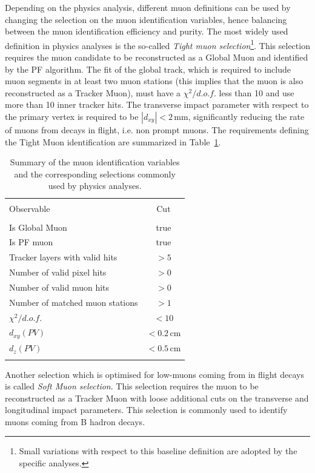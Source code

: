 Depending on the physics analysis, different muon definitions can be used by changing the selection on the muon identification variables, hence balancing between the muon identification efficiency and purity. The most widely used definition in physics analyses is the so-called \emph{Tight muon selection}\footnote{Small variations with respect to this baseline definition are adopted by the specific analyses.}. This selection requires the muon candidate to be reconstructed as a Global Muon and identified by the PF algorithm. The fit of the global track, which is required to include muon segments in at least two muon stations (this implies that the muon is also reconstructed as a Tracker Muon), must have a $\chi^2/d.o.f.$ less than 10 and use more than 10 inner tracker hits. The transverse impact parameter with respect to the primary vertex is required to be $|d_{xy}|<2$\,mm, significantly reducing the rate of muons from decays in flight, i.e. non prompt muons. The requirements defining the Tight Muon identification are summarized in Table~\ref{tab:tightmuon}.

\begin{table}[htb]
\caption{Summary of the muon identification variables and the corresponding selections commonly used by physics analyses.}\label{tab:tightmuon}
\centering
\begin{tabular}{lc}
\toprule \\
Observable & Cut \\
\midrule \\
Is Global Muon & true \\
Is PF muon & true \\
Tracker layers with valid hits & $>5$ \\
Number of valid pixel hits & $>0$ \\
Number of valid muon hits & $>0$ \\
Number of matched muon stations & $>1$ \\
$\chi^2/d.o.f.$ & $<10$ \\
$d_{xy}(PV)$ & $< 0.2$\,cm \\
$d_{z}(PV)$ & $< 0.5$\,cm \\
\bottomrule \\
\end{tabular}
\end{table}

Another selection which is optimised for low-\pt muons coming from in flight decays is called \emph{Soft Muon selection}. This selection requires the muon to be reconstructed as a Tracker Muon with loose additional cuts on the transverse and longitudinal impact parameters. This selection is commonly used to identify muons coming from B hadron decays.

